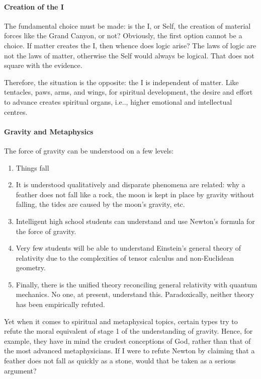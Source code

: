 \paragraph{Creation of the I}
The fundamental choice must be made: is the I, or Self, the creation of material forces like the Grand Canyon, or not? Obviously, the first option cannot be a choice. If matter creates the I, then whence does logic arise? The laws of logic are not the laws of matter, otherwise the Self would always be logical. That does not square with the evidence.

Therefore, the situation is the opposite: the I is independent of matter. Like tentacles, paws, arms, and wings, for spiritual development, the desire and effort to advance creates spiritual organs, i.e.., higher emotional and intellectual centres.

\paragraph{Gravity and Metaphysics}
The force of gravity can be understood on a few levels:

\begin{enumerate}
\item Things fall 
\item It is understood qualitatively and disparate phenomena are related: why a feather does not fall like a rock, the moon is kept in place by gravity without falling, the tides are caused by the moon's gravity, etc. 
\item Intelligent high school students can understand and use Newton's formula for the force of gravity. 
\item Very few students will be able to understand Einstein's general theory of relativity due to the complexities of tensor calculus and non-Euclidean geometry. 
\item Finally, there is the unified theory reconciling general relativity with quantum mechanics. No one, at present, understand this. Paradoxically, neither theory has been empirically refuted. 
\end{enumerate}
Yet when it comes to spiritual and metaphysical topics, certain types try to refute the moral equivalent of stage 1 of the understanding of gravity. Hence, for example, they have in mind the crudest conceptions of God, rather than that of the most advanced metaphysicians. If I were to refute Newton by claiming that a feather does not fall as quickly as a stone, would that be taken as a serious argument?

